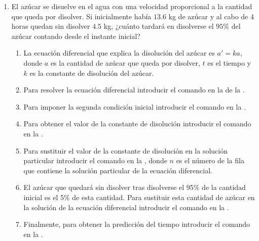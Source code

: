 \begin{enumerate}[leftmargin=*]
\item El azúcar se disuelve en el agua con una velocidad proporcional a la cantidad que queda por disolver.
      Si inicialmente había $13.6$ kg de azúcar y al cabo de $4$ horas quedan sin disolver $4.5$ kg, ¿cuánto tardará en disolverse el $95\%$ del
      azúcar contando desde el instante inicial?
      \begin{indication}
      \begin{enumerate}
      \item La ecuación diferencial que explica la disolución del azúcar es $a'=ka$, donde $a$ es la cantidad de azúcar que queda por disolver, $t$ es el tiempo y $k$ es la constante de disolución del azúcar.
      \item Para resolver la ecuación diferencial introducir el comando  en la  de la .
      \item Para imponer la segunda condición inicial introducir el comando  en la .
      \item Para obtener el valor de la constante de disolución introducir el comando  en la .
      \item Para sustituir el valor de la constante de disolución en la solución particular introducir el comando   en la , donde $n$ es el número de la fila que contiene la solución particular de la ecuación diferencial.
      \item El azúcar que quedará sin disolver tras disolverse el 95\% de la cantidad inicial es el 5\% de esta cantidad.
            Para sustituir esta cantidad de azúcar en la solución de la ecuación diferencial introducir el comando  en la .
      \item Finalmente, para obtener la predicción del tiempo introducir el comando   en la .
      \end{enumerate}
      \end{indication}

\end{enumerate}



